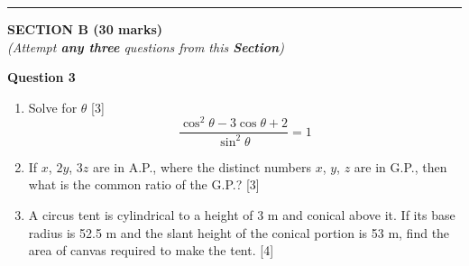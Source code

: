 \par\noindent\rule{\textwidth}{0.4pt}
\begin{center}
   \large
   \textbf{SECTION B (30 marks)}\\
   \vspace{5mm}
   \normalsize
   \textit{(Attempt \textbf{any three} questions from this \textbf{Section})}
\end{center}
\par

\noindent
\textbf{Question 3}
\begin{enumerate}[label=(\roman*)]

    \item Solve for $\theta$ \hfill [3]
        \[
            \frac{\cos^2 \theta - 3 \cos \theta + 2}{\sin^2 \theta} = 1
        \]

    \item If $x$, $2y$, $3z$ are in A.P., where the distinct numbers 
        $x$, $y$, $z$ are in G.P., then what is the common ratio of the G.P.?
        \hfill [3]

    \item A circus tent is cylindrical to a height of 3 m and conical 
        above it. If its base radius is 52.5 m and the slant height of 
        the conical portion is 53 m, find the area of canvas required 
        to make the tent. \hfill [4]

\end{enumerate}

